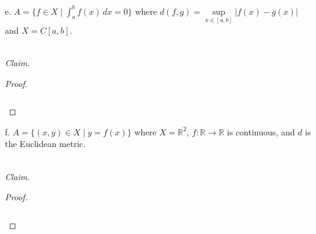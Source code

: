 \pagebreak

e.  $A = \{ f \in X \mid \int_a^b{f(x) \,dx} = 0 \}$ where $d(f, g) = \sup\limits_{x \in [a, b]}{|f(x) - g(x)|}$ and 
    $X = C[a, b]$.

\ \\
\emph{Claim.} 

\begin{proof}\renewcommand{\qedsymbol}{}\ \\\\
    \begin{align*}
    \end{align*}
\end{proof}

\pagebreak

f.  $A = \{ (x, y) \in X \mid y = f(x) \}$ where $X = \mathbb{R}^2$, $f:\mathbb{R} \to \mathbb{R}$ is continuous, and $d$ is 
    the Euclidean metric.

\ \\
\emph{Claim.} 

\begin{proof}\renewcommand{\qedsymbol}{}\ \\\\
    \begin{align*}
    \end{align*}
\end{proof}

\pagebreak